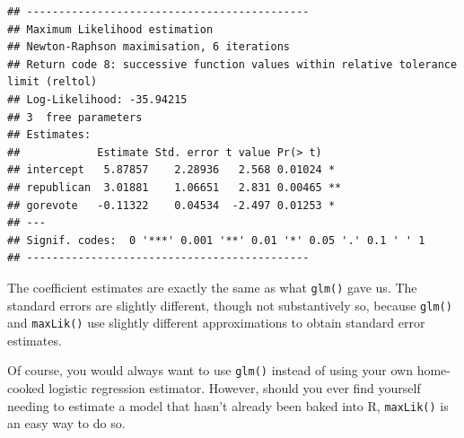 \documentclass[
  12pt,
  oneside,openany]{book}
\begin{document}
\begin{verbatim}
## --------------------------------------------
## Maximum Likelihood estimation
## Newton-Raphson maximisation, 6 iterations
## Return code 8: successive function values within relative tolerance limit (reltol)
## Log-Likelihood: -35.94215 
## 3  free parameters
## Estimates:
##            Estimate Std. error t value Pr(> t)   
## intercept   5.87857    2.28936   2.568 0.01024 * 
## republican  3.01881    1.06651   2.831 0.00465 **
## gorevote   -0.11322    0.04534  -2.497 0.01253 * 
## ---
## Signif. codes:  0 '***' 0.001 '**' 0.01 '*' 0.05 '.' 0.1 ' ' 1
## --------------------------------------------
\end{verbatim}

The coefficient estimates are exactly the same as what \texttt{glm()} gave us.
The standard errors are slightly different, though not substantively so, because \texttt{glm()} and \texttt{maxLik()} use slightly different approximations to obtain standard error estimates.

Of course, you would always want to use \texttt{glm()} instead of using your own home-cooked logistic regression estimator.
However, should you ever find yourself needing to estimate a model that hasn't already been baked into R, \texttt{maxLik()} is an easy way to do so.

  
\end{document}
